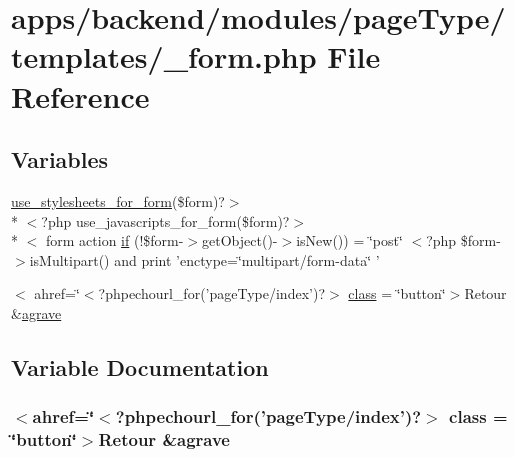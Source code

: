 \hypertarget{backend_2modules_2page_type_2templates_2__form_8php}{\section{apps/backend/modules/page\-Type/templates/\-\_\-form.php File Reference}
\label{backend_2modules_2page_type_2templates_2__form_8php}
}
\subsection*{Variables}
\begin{DoxyCompactItemize}
\item 
\hyperlink{live_2modules_2user_2templates_2__form_8php_a86bc4522fdbe625b07bc4a4d6eec3df7}{use\-\_\-stylesheets\-\_\-for\-\_\-form}(\$form)?$>$\\*
$<$?php use\-\_\-javascripts\-\_\-for\-\_\-form(\$form)?$>$\\*
$<$ form action \hyperlink{backend_2modules_2page_type_2templates_2__form_8php_abd1acf0179bbb4a56e04d4fccdbc121f}{if} (!\$form-\/$>$get\-Object()-\/$>$is\-New()) = \char`\"{}post\char`\"{} $<$?php \$form-\/$>$is\-Multipart() and print 'enctype=\char`\"{}multipart/form-\/data\char`\"{} '
\item 
$<$ ahref=\char`\"{}$<$?phpechourl\-\_\-for('page\-Type/index')?$>$ \hyperlink{backend_2modules_2page_type_2templates_2__form_8php_a6290e17b1778f2586edceef4f36938f2}{class} = \char`\"{}button\char`\"{}$>$Retour \&\hyperlink{presse_2modules_2page_2templates_2concours_ouikos_success_8php_adcbedde811e3c81b65c252edf38caea2}{agrave}
\end{DoxyCompactItemize}


\subsection{Variable Documentation}
\hypertarget{backend_2modules_2page_type_2templates_2__form_8php_a6290e17b1778f2586edceef4f36938f2}{
\subsubsection[{class}]{\setlength{\rightskip}{0pt plus 5cm}$<$ahref=\char`\"{}$<$?phpechourl\-\_\-for('page\-Type/index')?$>$ class = \char`\"{}button\char`\"{}$>$Retour \&{\bf agrave}}}\label{backend_2modules_2page_type_2templates_2__form_8php_a6290e17b1778f2586edceef4f36938f2}


